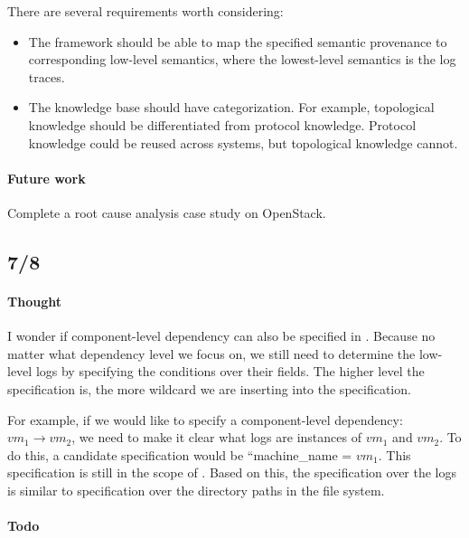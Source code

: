 \documentclass{article}
\begin{document}
\begin{itemize}
  There are several requirements worth considering:
  \begin{itemize}
  \item The framework should be able to map the specified semantic provenance to
    corresponding low-level semantics, where the lowest-level semantics is the
    log traces. 
  
  \item The knowledge base should have categorization. For example, topological
    knowledge should be differentiated from protocol knowledge. Protocol
    knowledge could be reused across systems, but topological knowledge cannot.

  \end{itemize}

\end{itemize}

\paragraph{Future work}
Complete a root cause analysis case study on OpenStack.

\subsection{7/8}
\label{sec:meeting:678}

\paragraph{Thought}
I wonder if component-level dependency can also be specified in \saf{}. Because no
matter what dependency level we focus on, we still need to determine the
low-level logs by specifying the conditions over their fields. The higher level the
specification is, the more wildcard we are inserting into the specification.

For example, if we would like to specify a component-level dependency: $vm_1
\rightarrow vm_2$, we need to make it clear what logs are instances of $vm_1$
and $vm_2$. To do this, a candidate specification would be ``machine\_name =
$vm_1$. This specification is still in the scope of \saf{}. Based on this, the
specification over the logs is similar to specification over the directory paths
in the file system.

\paragraph{Todo}
\end{document}
